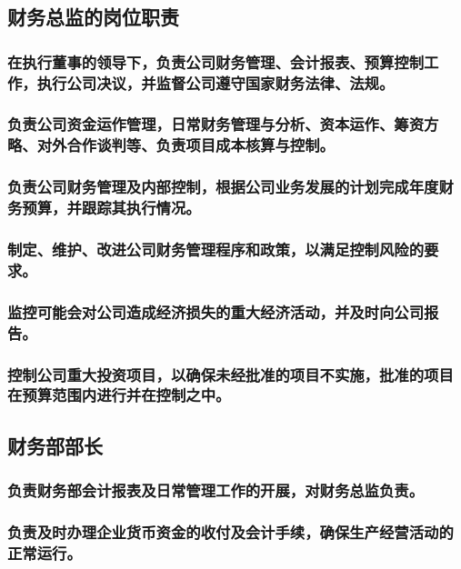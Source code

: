 \documentclass{ctexart}
\begin{document}
\subsection{财务总监的岗位职责}
\label{sec-1-6}
\subsubsection{在执行董事的领导下，负责公司财务管理、会计报表、预算控制工作，执行公司决议，并监督公司遵守国家财务法律、法规。}
\label{sec-1-6-1}
\subsubsection{负责公司资金运作管理，日常财务管理与分析、资本运作、筹资方略、对外合作谈判等、负责项目成本核算与控制。}
\label{sec-1-6-2}
\subsubsection{负责公司财务管理及内部控制，根据公司业务发展的计划完成年度财务预算，并跟踪其执行情况。}
\label{sec-1-6-3}
\subsubsection{制定、维护、改进公司财务管理程序和政策，以满足控制风险的要求。}
\label{sec-1-6-4}
\subsubsection{监控可能会对公司造成经济损失的重大经济活动，并及时向公司报告。}
\label{sec-1-6-5}
\subsubsection{控制公司重大投资项目，以确保未经批准的项目不实施，批准的项目在预算范围内进行并在控制之中。}
\label{sec-1-6-6}
\subsection{财务部部长}
\label{sec-1-7}
\subsubsection{负责财务部会计报表及日常管理工作的开展，对财务总监负责。}
\label{sec-1-7-1}
\subsubsection{负责及时办理企业货币资金的收付及会计手续，确保生产经营活动的正常运行。}
\label{sec-1-7-2}
\end{document}
